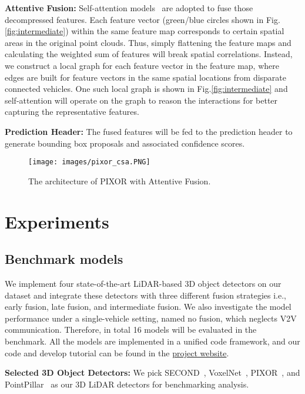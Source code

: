 \noindent\textbf{Attentive Fusion: }Self-attention models~\cite{vaswani2017attention} are adopted to fuse those decompressed features. Each feature vector (green/blue circles shown in Fig.\ref{fig:intermediate}) within the same feature map corresponds to certain spatial areas in the original point clouds. Thus, simply flattening the feature maps and calculating the weighted sum of features will break spatial correlations. Instead, we construct a local graph for each feature vector in the feature map, where edges are built for feature vectors in the same spatial locations from disparate connected vehicles. One such local graph is shown in Fig.\ref{fig:intermediate} and self-attention will operate on the graph to reason the interactions for better capturing the representative features. 

\noindent\textbf{Prediction Header: }The fused features will be fed to the prediction header to generate bounding box proposals and associated confidence scores. 

\begin{figure}
    \centering
    \texttt{[image: images/pixor\_csa.PNG]}
    \caption{The architecture of PIXOR with Attentive Fusion. }
    \label{fig:pixor}
\end{figure}

\section{Experiments}

\subsection{Benchmark models}
We implement four state-of-the-art LiDAR-based 3D object detectors on our dataset and integrate these detectors with three different fusion strategies i.e., early fusion, late fusion, and intermediate fusion. We also investigate the model performance under a single-vehicle setting, named no fusion, which neglects V2V communication. Therefore, in total 16 models will be evaluated in the benchmark. All the models are implemented in a unified code framework, and  our code and develop tutorial can be found in the \textcolor{blue}{\href{https://mobility-lab.seas.ucla.edu/opv2v/}{project website}}.

\noindent\textbf{Selected 3D Object Detectors: } 
We pick SECOND~\cite{Yan2018SECONDSE}, VoxelNet~\cite{voxelnet}, PIXOR~\cite{Yang2018PIXORR3}, and PointPillar~\cite{pointpillar} as our 3D LiDAR detectors for benchmarking analysis.

